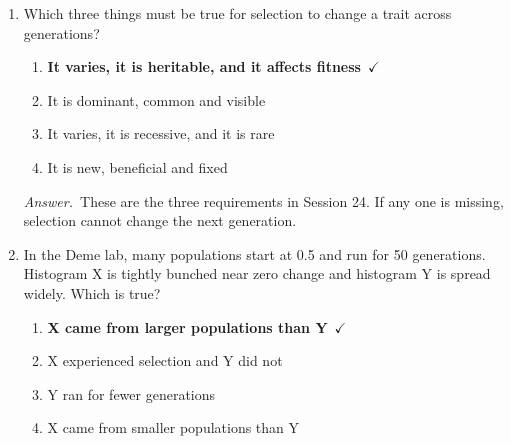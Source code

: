 \documentclass[11pt]{article}
\newcommand{\keyans}[1]{\par\medskip\noindent\textit{Answer.}\ #1\par\medskip}
\begin{document}
\begin{enumerate}[label=\textbf{\arabic*.}, leftmargin=2em, itemsep=1.4em]
\item Which three things must be true for selection to change a trait across generations?
\nopagebreak\par{}
\par\smallskip
\begin{enumerate}[label={}, leftmargin=2.4em, labelwidth=0pt, itemsep=2pt, topsep=0pt]
\item \hspace*{-2.4em}\textbf{It varies, it is heritable, and it affects fitness}\ \(\checkmark\)
\item \hspace*{-2.4em}It is dominant, common and visible
\item \hspace*{-2.4em}It varies, it is recessive, and it is rare
\item \hspace*{-2.4em}It is new, beneficial and fixed
\end{enumerate}
\keyans{These are the three requirements in Session 24. If any one is missing, selection cannot change the next generation.}
\item In the Deme lab, many populations start at 0.5 and run for 50 generations. Histogram X is tightly bunched near zero change and histogram Y is spread widely. Which is true?
\nopagebreak\par{}
\par\smallskip
\begin{enumerate}[label={}, leftmargin=2.4em, labelwidth=0pt, itemsep=2pt, topsep=0pt]
\item \hspace*{-2.4em}\textbf{X came from larger populations than Y}\ \(\checkmark\)
\item \hspace*{-2.4em}X experienced selection and Y did not
\item \hspace*{-2.4em}Y ran for fewer generations
\item \hspace*{-2.4em}X came from smaller populations than Y
\end{enumerate}

\end{enumerate}
\end{document}

